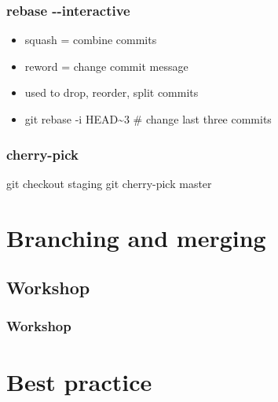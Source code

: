 \documentclass{beamer}
\begin{document}
		\begin{frame}
      \frametitle{rebase -{}-interactive}
			\begin{itemize}
          \item squash = combine commits
          \item reword = change commit message
          \item used to drop, reorder, split commits
          \item git rebase -i HEAD\textasciitilde 3 \# change last three commits
			\end{itemize}
		\end{frame}

		\begin{frame}
			\frametitle{cherry-pick}
			\begin{center}
			\end{center}
			git checkout staging \: \: git cherry-pick master
		\end{frame}

		
		
	\section{Branching and merging}
				
		\subsection{Workshop}
		\begin{frame}
			\frametitle{Workshop}
		\end{frame}


	\section{Best practice}
\end{document}
